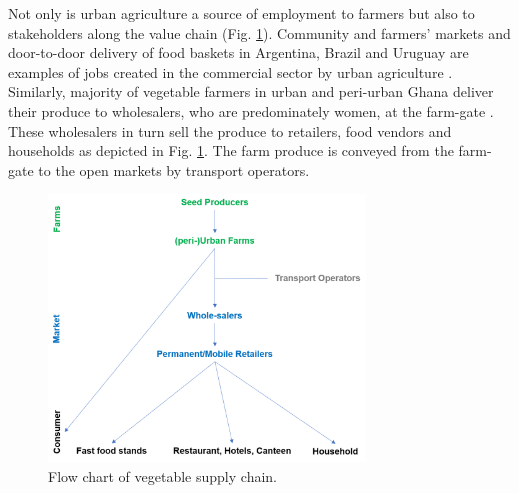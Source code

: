 Not only is urban agriculture a source of employment to farmers but also to stakeholders along the value chain (Fig. \ref{fig:vegySupplyChain}). Community and farmers' markets and door-to-door delivery of food baskets in Argentina, Brazil and Uruguay are examples of jobs created in the commercial sector by urban agriculture \cite{InternationalLabourOrganization2006}. Similarly, majority of vegetable farmers in urban and peri-urban Ghana deliver their produce to wholesalers, who are predominately women, at the farm-gate \cite{Amponsah2016a, Amoah2007}. These wholesalers in turn sell the produce to retailers, food vendors and households as depicted in Fig. \ref{fig:vegySupplyChain}. The farm produce is conveyed from the farm-gate to the open markets by transport operators.

\begin{figure}[th]
\centering
\includegraphics[width=0.75\textwidth]{./Figures/vegySupplyChain.png}
\decoRule
\caption[Flow chart of vegetable supply chain]{Flow chart of vegetable supply chain. \cite{Drechsel2014}}
\label{fig:vegySupplyChain}
\end{figure}


